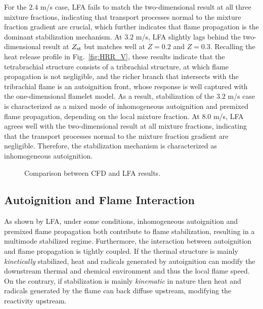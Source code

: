 \documentclass[review,3p,times]{elsarticle}
\begin{document}
For the $2.4$ m/s case, LFA fails to match the two-dimensional result at all three mixture fractions, indicating that transport processes normal to the mixture fraction gradient are crucial, which further indicates that flame propagation is the dominant stabilization mechanism.  At $3.2$ m/s, LFA slightly lags behind the two-dimensional result at $Z_{\rm st}$ but matches well at $Z = 0.2$ and $Z = 0.3$.  Recalling the heat release profile in Fig.~\ref{fig:HRR_V}, these results indicate that the tetrabrachial structure consists of a tribrachial structure, at which flame propagation is not negligible, and the richer branch that intersects with the tribrachial flame is an autoignition front, whose response is well captured with the one-dimensional flamelet model.  As a result, stabilization of the $3.2$ m/s case is characterized as a mixed mode of inhomogeneous autoignition and premixed flame propagation, depending on the local mixture fraction.  At $8.0$ m/s, LFA agrees well with the two-dimensional result at all mixture fractions, indicating that the transport processes normal to the mixture fraction gradient are negligible.  Therefore, the stabilization mechanism is characterized as inhomogeneous autoignition.

\begin{figure}
  \centering
  \scriptsize
  \resizebox{1.0\textwidth}{!}{}
  \normalsize
  \vspace{-0.2in}
  \caption{Comparison between CFD and LFA results.}
  \label{fig:LFA_V}
\end{figure}

\subsection{Autoignition and Flame Interaction}

As shown by LFA, under some conditions, inhomogeneous autoignition and premixed flame propagation both contribute to flame stabilization, resulting in a multimode stabilized regime.  Furthermore, the interaction between autoignition and flame propagation is tightly coupled.  If the thermal structure is mainly \emph{kinetically} stabilized, heat and radicals generated by autoignition can modify the  downstream thermal and chemical environment and thus the local flame speed.  On the contrary, if stabilization is mainly \emph{kinematic} in nature then heat and radicals generated by the flame can back diffuse upstream, modifying the reactivity upstream.  
\end{document}
